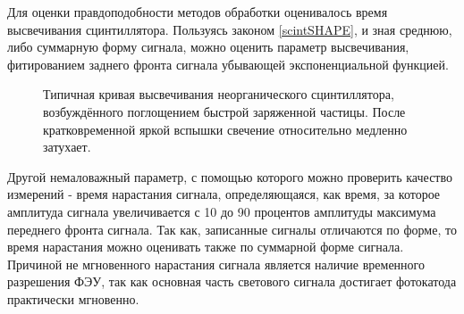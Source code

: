 Для оценки правдоподобности методов обработки оценивалось время высвечивания сцинтиллятора.
Пользуясь законом \eqref{scintSHAPE}, и зная среднюю, либо суммарную форму сигнала, можно оценить параметр высвечивания, фитированием заднего фронта сигнала убывающей экспоненциальной функцией.

\begin{figure}[!h]
	\caption{Типичная кривая высвечивания неорганического сцинтиллятора, возбуждённого поглощением быстрой заряженной частицы. После кратковременной яркой вспышки свечение относительно медленно затухает.}
	\label{ris:scintSHAPE}
\end{figure}



Другой немаловажный параметр, с помощью которого можно проверить качество измерений - время нарастания сигнала, определяющаяся, как время, за которое амплитуда сигнала увеличивается с 10 до 90 процентов амплитуды максимума переднего фронта сигнала. Так как, записанные сигналы отличаются по форме, то время нарастания можно оценивать также по суммарной форме сигнала. Причиной не мгновенного нарастания сигнала является наличие временного разрешения ФЭУ, так как основная часть светового сигнала достигает фотокатода практически мгновенно. 
